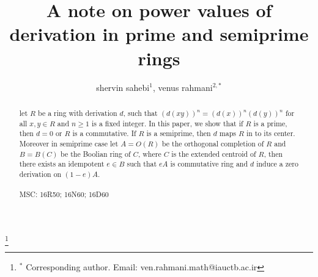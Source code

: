 \documentclass[12pt]{amsart}
\theoremstyle{definition}
\theoremstyle{remark}
\begin{document}
\title [A note on power values of  derivation  in prime . . .]
  {A note on power values of  derivation  in prime and semiprime rings}

\author{shervin sahebi$^{1}$, venus rahmani$^{2,*}$ }
\thanks{$^{*}$ Corresponding author.  Email: ven.rahmani.math@iauctb.ac.ir}

\address{ $^{1,2}$ Department Of Mathematics, Islamic Azad University,
 Central Tehran Branch, 13185/768, Tehran, Iran.}


\begin{abstract}
 let $R$ be a ring with derivation $d$,
 such that $(d(xy))^n=(d(x))^n(d(y))^n$ for all
 $x, y \in R$ and $n\geq 1$ is a fixed integer.
 In this paper, we show that
 if $R$ is a prime,
 then $d=0$ or $R$ is a commutative.
 If $R$ is a semiprime,
 then $d$ maps $R$ in to its center.
 Moreover in semiprime case let $A=O(R)$ be the
 orthogonal completion of $R$ and $B=B(C)$ be the Boolian ring of $C$,
 where $C$ is the extended centroid of $R$, then there exists
 an idempotent $e\in B$ such that $eA$ is commutative
 ring and $d$ induce a zero derivation on $(1-e)A$.\\ \\

 MSC: 16R50; 16N60; 16D60
 \end{abstract}

\maketitle
\end{document}
